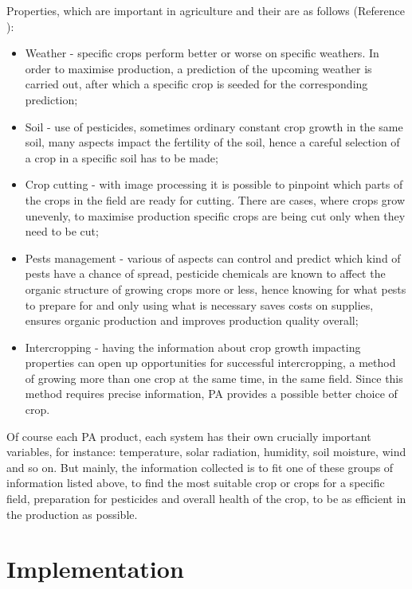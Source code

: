 \documentclass[11pt,a5paper,footinclude=true,headinclude=true, oneside]{scrbook}
\begin{document}
Properties, which are important in agriculture and their are as follows (Reference \cite{lokhande_effective_2021}): 
\begin{itemize}
    \item Weather - specific crops perform better or worse on specific weathers. In order to maximise production, a prediction of the upcoming weather is carried out, after which a specific crop is seeded for the corresponding prediction;
    \item Soil - use of pesticides, sometimes ordinary constant crop growth in the same soil, many aspects impact the fertility of the soil, hence a careful selection of a crop in a specific soil has to be made;
    \item Crop cutting - with image processing it is possible to pinpoint which parts of the crops in the field are ready for cutting. There are cases, where crops grow unevenly, to maximise production specific crops are being cut only when they need to be cut;
    \item Pests management - various of aspects can control and predict which kind of pests have a chance of spread, pesticide chemicals are known to affect the organic structure of growing crops more or less, hence knowing for what pests to prepare for and only using what is necessary saves costs on supplies, ensures organic production and improves production quality overall;
    \item Intercropping - having the information about crop growth impacting properties can open up opportunities for successful intercropping, a method of growing more than one crop at the same time, in the same field. Since this method requires precise information, PA provides a possible better choice of crop.
\end{itemize}
Of course each PA product, each system has their own crucially important variables, for instance: temperature, solar radiation, humidity, soil moisture, wind and so on. But mainly, the  information collected is to fit one of these groups of information listed above, to find the most suitable crop or crops for a specific field, preparation for pesticides and overall health of the crop, to be as efficient in the production as possible. 
    
\section{Implementation}
\end{document}
